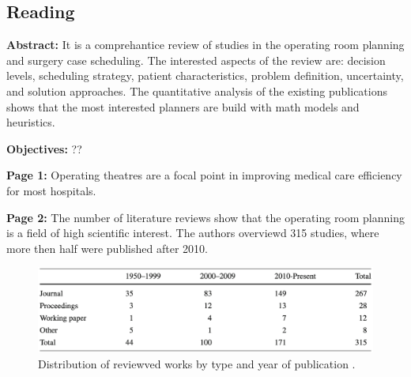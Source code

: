 \subsection{Reading}
    \textbf{Abstract:}
    It is a comprehantice review of studies in the operating room planning and surgery case scheduling. The interested aspects of the review are: decision levels, scheduling strategy, patient characteristics, problem definition, uncertainty, and solution approaches. The quantitative analysis of the existing publications shows that the most interested planners are build with math models and heuristics.
    
    \textbf{Objectives:}
    ??
    
    \textbf{Page 1:}
    Operating theatres are a focal point in improving medical care efficiency for most hospitals.
    
    \textbf{Page 2:}
    The number of literature reviews show that the operating room planning is a field of high scientific interest. The authors overviewd 315 studies, where more then half were published after 2010.
    \begin{figure}[H]
        \centering
        \includegraphics[width=1\textwidth]{figures/SR0013CN19/fig1.png}
        \caption{Distribution of reviewved works by type and year of publication \cite{x203}.}
        \label{fig1:SR0013CN19}
    \end{figure}
    
